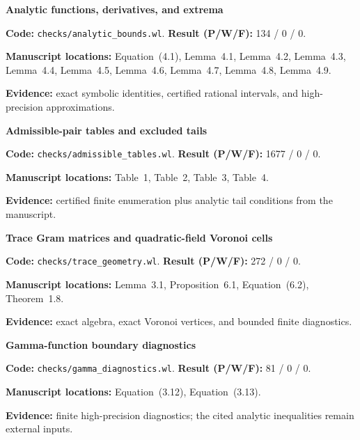 {\small
\noindent\textbf{Analytic functions, derivatives, and extrema}\par
\textbf{Code:} \nolinkurl{checks/analytic_bounds.wl}. \textbf{Result (P/W/F):} 134 / 0 / 0.\par
\textbf{Manuscript locations:} Equation~(4.1), Lemma~4.1, Lemma~4.2, Lemma~4.3, Lemma~4.4, Lemma~4.5, Lemma~4.6, Lemma~4.7, Lemma~4.8, Lemma~4.9.\par
\textbf{Evidence:} exact symbolic identities, certified rational intervals, and high-precision approximations.\par
\medskip
\noindent\textbf{Admissible-pair tables and excluded tails}\par
\textbf{Code:} \nolinkurl{checks/admissible_tables.wl}. \textbf{Result (P/W/F):} 1677 / 0 / 0.\par
\textbf{Manuscript locations:} Table~1, Table~2, Table~3, Table~4.\par
\textbf{Evidence:} certified finite enumeration plus analytic tail conditions from the manuscript.\par
\medskip
\noindent\textbf{Trace Gram matrices and quadratic-field Voronoi cells}\par
\textbf{Code:} \nolinkurl{checks/trace_geometry.wl}. \textbf{Result (P/W/F):} 272 / 0 / 0.\par
\textbf{Manuscript locations:} Lemma~3.1, Proposition~6.1, Equation~(6.2), Theorem~1.8.\par
\textbf{Evidence:} exact algebra, exact Voronoi vertices, and bounded finite diagnostics.\par
\medskip
\noindent\textbf{Gamma-function boundary diagnostics}\par
\textbf{Code:} \nolinkurl{checks/gamma_diagnostics.wl}. \textbf{Result (P/W/F):} 81 / 0 / 0.\par
\textbf{Manuscript locations:} Equation~(3.12), Equation~(3.13).\par
\textbf{Evidence:} finite high-precision diagnostics; the cited analytic inequalities remain external inputs.\par
}

